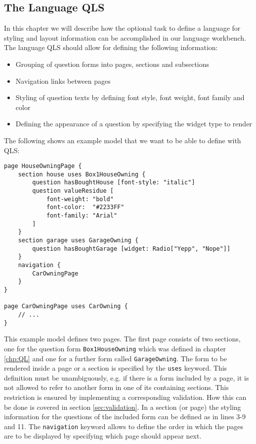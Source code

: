 \subsection{The Language QLS}

In this chapter we will describe how the optional task to define a language 
for styling and layout information can be accomplished in our language workbench.
The language QLS should allow for defining the following information:
\begin{itemize}
  \item Grouping of question forms into pages, sections and subsections
  \item Navigation links between pages
  \item Styling of question texts by defining font style, font weight, font
  family and color
  \item Defining the appearance of a question by specifying the widget type to render
\end{itemize}

The following shows an example model that we want to be able to define with QLS:

\begin{lstlisting}[language=QLS]
page HouseOwningPage {
	section house uses Box1HouseOwning {
		question hasBoughtHouse [font-style: "italic"]
		question valueResidue [
			font-weight: "bold" 
			font-color:  "#2233FF"
			font-family: "Arial"
		]
	}
	section garage uses GarageOwning {
		question hasBoughtGarage [widget: Radio["Yepp", "Nope"]]		
	}
	navigation {
		CarOwningPage
	}
}

page CarOwningPage uses CarOwning {
	// ...
}
\end{lstlisting}

This example model defines two pages. The first page consists of two sections,
one for the question form \texttt{Box1HouseOwning} which was defined in chapter 
\ref{chp:QL} and one for a further form called \texttt{GarageOwning}. The form to
be rendered inside a page or a section is specified by the \texttt{uses} keyword.
This definition must be unambiguously, e.g. if there is a form included by a page,
it is not allowed to refer to another form in one of its containing sections.
This restriction is ensured by implementing a corresponding validation. How this
can be done is covered in section \ref{sec:validation}. In a section (or page)
the styling information for the questions of the included form can be defined as
in lines 3-9 and 11. The \texttt{navigation} keyword allows to define the order
in which the pages are to be displayed by specifying which page should appear next.


